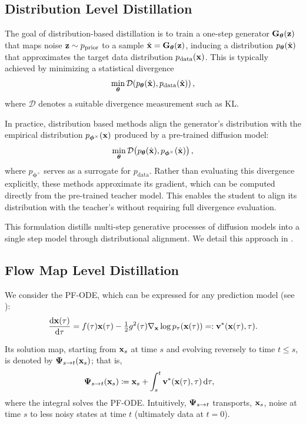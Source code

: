 \subsection{Distribution Level Distillation}  
The goal of distribution-based distillation is to train a one-step generator ${\mathbf{G}}_{\bm{\theta}}({\mathbf{z}})$ that maps noise ${\mathbf{z}} \sim p_{\mathrm{prior}}$ to a sample $\hat{{\mathbf{x}}} = {\mathbf{G}}_{\bm{\theta}}({\mathbf{z}})$, inducing a distribution $p_{\bm{\theta}}(\hat{{\mathbf{x}}})$ that approximates the target data distribution $p_{\mathrm{data}}({\mathbf{x}})$. This is typically achieved by minimizing a statistical divergence
\[
\min_{\bm{\theta}}  \mathcal{D}\!\left(p_{\bm{\theta}}(\hat{{\mathbf{x}}}),  p_{\mathrm{data}}(\hat{{\mathbf{x}}})\right),
\]
where $\mathcal{D}$ denotes a suitable divergence measurement such as KL.  

In practice, distribution based methods align the generator’s distribution with the empirical distribution $p_{\bm{\phi}^\times}({\mathbf{x}})$ produced by a pre-trained diffusion model:
\[
\min_{\bm{\theta}}  \mathcal{D}\!\left(p_{\bm{\theta}}(\hat{{\mathbf{x}}}),  p_{\bm{\phi}^\times}(\hat{{\mathbf{x}}})\right),
\]
where $p_{\bm{\phi}^\times}$ serves as a surrogate for $p_{\mathrm{data}}$. Rather than evaluating this divergence explicitly, these methods approximate its gradient, which can be computed directly from the pre-trained teacher model. 
This enables the student to align its distribution with the teacher’s without requiring full divergence evaluation.

This formulation distills multi-step generative processes of diffusion models into a single step model through distributional alignment. We detail this approach in .




\subsection{Flow Map Level Distillation} We consider the PF-ODE, which can be expressed for any prediction model (see ):
\begin{align}\label{eq:pf-ode-ct}
    \frac{\mathop{}\!\mathrm{d} {\mathbf{x}}(\tau)}{\mathop{}\!\mathrm{d} \tau} 
    = f(\tau) {\mathbf{x}}(\tau) - \tfrac{1}{2}g^2(\tau) \nabla_{\mathbf{x}} \log p_\tau({\mathbf{x}}(\tau)) 
    =: {\mathbf{v}}^*({\mathbf{x}}(\tau), \tau).
\end{align}

Its solution map, starting from ${\mathbf{x}}_s$ at time $s$ and evolving reversely to time $t \leq s$, is denoted by ${\bm{\Psi}}_{s\to t}({\mathbf{x}}_s)$; that is,
\begin{align}\label{eq:int_target_gt}
\begin{aligned}
    {\bm{\Psi}}_{s\to t}({\mathbf{x}}_s) 
    &\coloneqq {\mathbf{x}}_s + \int_s^t {\mathbf{v}}^*({\mathbf{x}}(\tau), \tau) \mathop{}\!\mathrm{d} \tau,
\end{aligned}
\end{align}
where the integral solves the PF-ODE. Intuitively, ${\bm{\Psi}}_{s\to t}$ transports, ${\mathbf{x}}_s$, noise at time $s$ to less noisy states at time $t$ (ultimately data at $t=0$).


